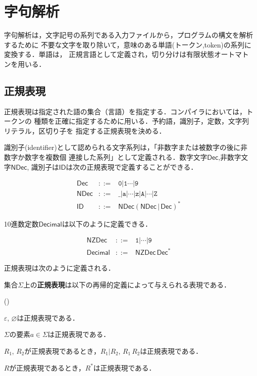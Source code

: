 \documentclass[a4j,dvipdfmx]{jbook}
\begin{document}
\chapter{字句解析}

字句解析は，文字記号の系列である入力ファイルから，プログラムの構文を解析するために
不要な文字を取り除いて，意味のある単語(トークン,token)の系列に変換する．単語は，
正規言語として定義され，切り分けは有限状態オートマトンを用いる．

\section{正規表現}

正規表現は指定された語の集合（言語）を指定する．コンパイラにおいては，トークンの
種類を正確に指定するために用いる．予約語，識別子，定数，文字列リテラル，区切り子を
指定する正規表現を決める．

識別子(identifier)として認められる文字系列は，「非数字または被数字の後に非数字か数字を複数個
連接した系列」として定義される．数字文字$\mathsf{Dec}$,非数字文字$\mathsf{NDec}$,
識別子は$\mathsf{ID}$は次の正規表現で定義することができる．

\[\begin{array}{rcl}
    \mathsf{Dec}  & \mathtt{::=} & \texttt{0}|\texttt{1}\cdots|\texttt{9}                                \\
    \mathsf{NDec} & \mathtt{::=} & \texttt{\_}|\texttt{a}|\cdots|\texttt{z}|\texttt{A}|\cdots|\texttt{Z} \\
    \mathsf{ID}   & \mathtt{::=} & \mathsf{NDec}(\mathsf{NDec}\,|\,\mathsf{Dec})^\ast
  \end{array}\]

10進数定数$\mathsf{Decimal}$は以下のように定義できる．

\[\begin{array}{rcl}
    \mathsf{NZDec}   & \mathtt{::=} & \texttt{1}|\cdots|\texttt{9}      \\
    \mathsf{Decimal} & \mathtt{::=} & \mathsf{NZDec}\,\mathsf{Dec}^\ast
  \end{array}\]

正規表現は次のように定義される．

\begin{Def}
  集合$\Sigma$上の{\bf 正規表現}は以下の再帰的定義によって与えられる表現である．
  \begin{list}{()}{}
    \item\label{firstR} $\varepsilon$, $\varnothing$は正規表現である．
    \item\label{secondR} $\Sigma$の要素$a\in\Sigma$は正規表現である．
    \item\label{thirdR} $R_1$, $R_2$が正規表現であるとき，$R_1|R_2$, $R_1\,R_2$は正規表現である．
    \item\label{fourthR} $R$が正規表現であるとき，$R^\ast$は正規表現である．
  \end{list}
\end{Def}
\end{document}
